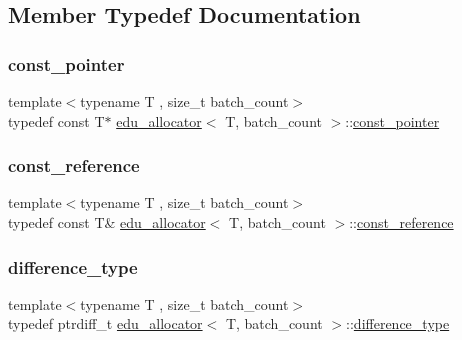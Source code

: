 \subsection{Member Typedef Documentation}
\mbox{\label{classedu__allocator_afc0a1fdcec60f3297dab399d8988267b}} 
\subsubsection{\texorpdfstring{const\+\_\+pointer}{const\_pointer}}
{\footnotesize\ttfamily template$<$typename T , size\+\_\+t batch\+\_\+count$>$ \\
typedef const T$\ast$ \hyperlink{classedu__allocator}{edu\+\_\+allocator}$<$ T, batch\+\_\+count $>$\+::\hyperlink{classedu__allocator_afc0a1fdcec60f3297dab399d8988267b}{const\+\_\+pointer}}

\mbox{\label{classedu__allocator_a8ce4e19bea2bf7de59ffa26a87ea814a}} 
\subsubsection{\texorpdfstring{const\+\_\+reference}{const\_reference}}
{\footnotesize\ttfamily template$<$typename T , size\+\_\+t batch\+\_\+count$>$ \\
typedef const T\& \hyperlink{classedu__allocator}{edu\+\_\+allocator}$<$ T, batch\+\_\+count $>$\+::\hyperlink{classedu__allocator_a8ce4e19bea2bf7de59ffa26a87ea814a}{const\+\_\+reference}}

\mbox{\label{classedu__allocator_adb851ac1c1993a9fe70fef1942775426}} 
\subsubsection{\texorpdfstring{difference\+\_\+type}{difference\_type}}
{\footnotesize\ttfamily template$<$typename T , size\+\_\+t batch\+\_\+count$>$ \\
typedef ptrdiff\+\_\+t \hyperlink{classedu__allocator}{edu\+\_\+allocator}$<$ T, batch\+\_\+count $>$\+::\hyperlink{classedu__allocator_adb851ac1c1993a9fe70fef1942775426}{difference\+\_\+type}}

